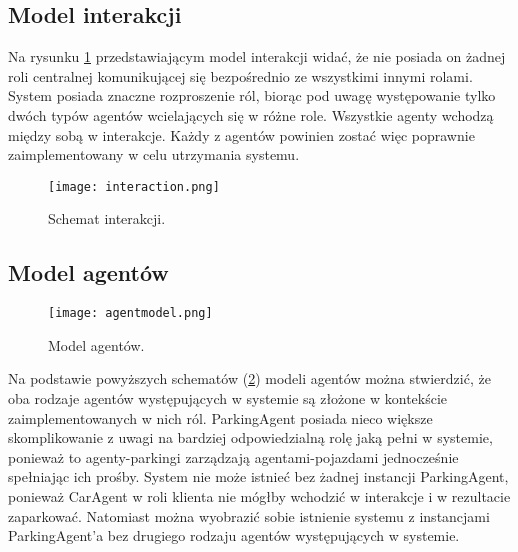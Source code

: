 
\newpage
\subsection{Model interakcji}

Na rysunku \ref{fig:interaction} przedstawiającym model interakcji widać, że nie posiada on żadnej roli centralnej komunikującej się bezpośrednio ze wszystkimi innymi rolami. System posiada znaczne rozproszenie ról, biorąc pod uwagę występowanie tylko dwóch typów agentów wcielających się w różne role. Wszystkie agenty wchodzą między sobą w interakcje. Każdy z agentów powinien zostać więc poprawnie zaimplementowany w celu utrzymania systemu.

\begin{figure}[h!]
    \centering \texttt{[image: interaction.png]}
    \caption{Schemat interakcji.}
    \label{fig:interaction}
\end{figure}




\newpage
\subsection{Model agentów}

\begin{figure}[h!]
    \centering \texttt{[image: agentmodel.png]}
    \caption{Model agentów.}
    \label{fig:agentmodel}
\end{figure}

Na podstawie powyższych schematów (\ref{fig:agentmodel}) modeli agentów można stwierdzić, że oba rodzaje agentów  występujących w systemie są złożone w kontekście zaimplementowanych w nich ról. ParkingAgent posiada nieco większe skomplikowanie z uwagi na bardziej odpowiedzialną rolę jaką pełni w systemie, ponieważ to agenty-parkingi zarządzają agentami-pojazdami jednocześnie spełniając ich prośby. System nie może istnieć bez żadnej instancji ParkingAgent, ponieważ CarAgent w roli klienta nie mógłby wchodzić w interakcje i w rezultacie zaparkować. Natomiast można wyobrazić sobie istnienie systemu z instancjami ParkingAgent’a bez drugiego rodzaju agentów występujących w systemie.

\newpage

